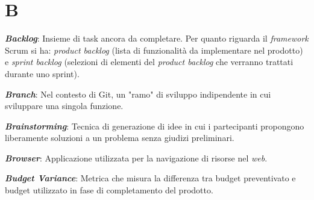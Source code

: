 \documentclass[5pt]{article}
\begin{document}
\pagebreak

\section*{B}
\begin{flushleft}
	
\textbf{\textit{Backlog}}: Insieme di task ancora da completare. Per quanto riguarda il \textit{framework} Scrum si ha: \textit{product backlog} (lista di funzionalità da implementare nel prodotto) e \textit{sprint backlog} (selezioni di elementi del \textit{product backlog} che verranno trattati durante uno sprint).\newline
	
\textbf{\textit{Branch}}: Nel contesto di Git, un "ramo" di sviluppo indipendente in cui sviluppare una singola funzione.\newline

\textbf{\textit{Brainstorming}}: Tecnica di generazione di idee in cui i partecipanti propongono liberamente soluzioni a un problema senza giudizi preliminari.\newline

\textbf{\textit{Browser}}: Applicazione utilizzata per la navigazione di risorse nel \textit{web}. \newline

\textbf{\textit{Budget Variance}}: Metrica che misura la differenza tra budget preventivato e budget utilizzato in fase di completamento del prodotto.\newline
	

\end{flushleft}

\pagebreak
\end{document}
